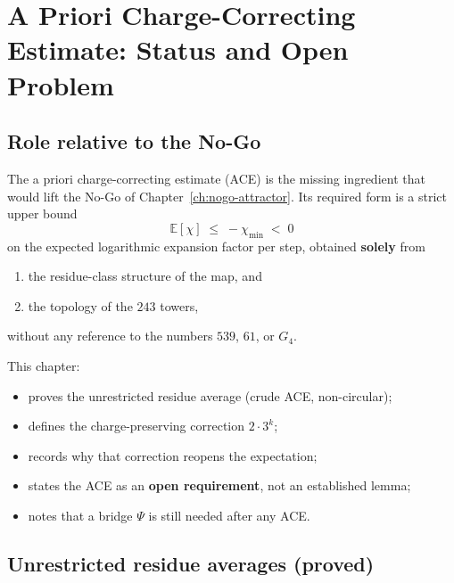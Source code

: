 
\chapter{A Priori Charge-Correcting Estimate: Status and Open Problem}
\label{ch:ACE}

\section{Role relative to the No-Go}

The a priori charge-correcting estimate (ACE) is the missing ingredient that
would lift the No-Go of Chapter~\ref{ch:nogo-attractor}. Its required form is
a strict upper bound
\begin{equation}
\label{eq:ACE-req}
\mathbb{E}[\chi]
\;\le\;
-\chi_{\min}
\;<\;0
\end{equation}
on the expected logarithmic expansion factor per step, obtained \textbf{solely}
from
\begin{enumerate}[label=(\roman*)]
  \item the residue-class structure of the map, and
  \item the topology of the \(243\) towers,
\end{enumerate}
without any reference to the numbers \(539\), \(61\), or \(G_4\).

This chapter:
\begin{itemize}
  \item proves the unrestricted residue average (crude ACE, non-circular);
  \item defines the charge-preserving correction \(2\cdot 3^k\);
  \item records why that correction reopens the expectation;
  \item states the ACE as an \textbf{open requirement}, not an established lemma;
  \item notes that a bridge \(\Psi\) is still needed after any ACE.
\end{itemize}

\section{Unrestricted residue averages (proved)}
\label{sec:unrestricted}

